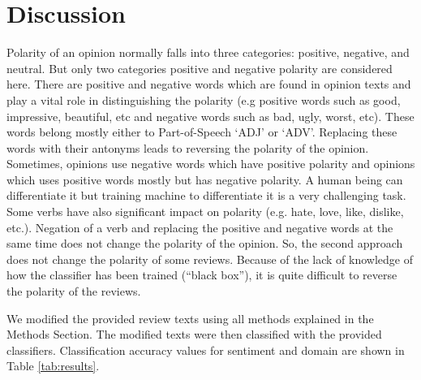 \documentclass[11pt,a4paper]{article}
\begin{document}
\section{Discussion}
Polarity of an opinion normally falls into three categories: positive, negative, and neutral. But only two categories positive and negative polarity are considered here. There are positive and negative words which are found in opinion texts and play a vital role in distinguishing the polarity (e.g positive words such as good, impressive, beautiful, etc and negative words such as bad, ugly, worst, etc). These words belong mostly either to Part-of-Speech ‘ADJ’ or ‘ADV’. Replacing these words with their antonyms leads to reversing the polarity of the opinion. Sometimes, opinions use negative words which have positive polarity and opinions which uses positive words mostly but has negative polarity. A human being can differentiate it but training machine to differentiate it is a very challenging task. Some verbs have also significant impact on polarity (e.g. hate, love, like, dislike, etc.). Negation of a verb and replacing the positive and negative words at the same time does not change the polarity of the opinion. So, the second approach does not change the polarity of some reviews. Because of the lack of knowledge of how the classifier has been trained (``black box''), it is quite difficult to reverse the polarity of the reviews.

We modified the provided review texts using all methods explained in the Methods Section. The modified texts were then classified with the provided classifiers. Classification accuracy values for sentiment and domain are shown in Table \ref{tab:results}. 
\end{document}
